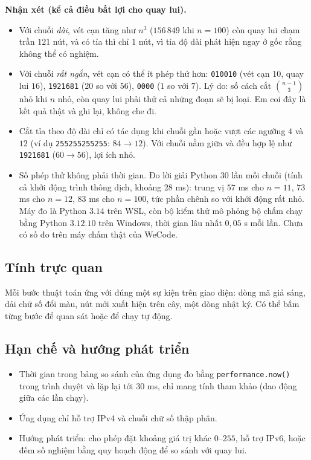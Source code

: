 \documentclass[12pt,a4paper]{article}
\begin{document}
\textbf{Nhận xét (kể cả điều bất lợi cho quay lui).}
\begin{itemize}
    \item Với chuỗi \emph{dài}, vét cạn tăng như $n^3$ ($156\,849$ khi $n=100$) còn quay lui chạm trần $121$ nút, và có tỉa thì chỉ $1$ nút, vì tỉa độ dài phát hiện ngay ở gốc rằng không thể có nghiệm.
    \item Với chuỗi \emph{rất ngắn}, vét cạn có thể ít phép thử hơn: \texttt{010010} (vét cạn $10$, quay lui $16$), \texttt{1921681} ($20$ so với $56$), \texttt{0000} ($1$ so với $7$). Lý do: số cách cắt $\binom{n-1}{3}$ nhỏ khi $n$ nhỏ, còn quay lui phải thử cả những đoạn sẽ bị loại. Em coi đây là kết quả thật và ghi lại, không che đi.
    \item Cắt tỉa theo độ dài chỉ có tác dụng khi chuỗi gần hoặc vượt các ngưỡng $4$ và $12$ (ví dụ \texttt{255255255255}: $84 \to 12$). Với chuỗi nằm giữa và đều hợp lệ như \texttt{1921681} ($60 \to 56$), lợi ích nhỏ.
    \item Số phép thử không phải thời gian. Đo lời giải Python $30$ lần mỗi chuỗi (tính cả khởi động trình thông dịch, khoảng $28$ ms): trung vị $57$ ms cho $n=11$, $73$ ms cho $n=12$, $83$ ms cho $n=100$, tức phần chênh so với khởi động rất nhỏ. Máy đo là Python $3.14$ trên WSL, còn bộ kiểm thử mô phỏng bộ chấm chạy bằng Python $3.12.10$ trên Windows, thời gian lâu nhất $0{,}05$ s mỗi lần. Chưa có số đo trên máy chấm thật của WeCode.
\end{itemize}

\subsection{Tính trực quan}
Mỗi bước thuật toán ứng với đúng một sự kiện trên giao diện: dòng mã giả sáng, dải chữ số đổi màu, nút mới xuất hiện trên cây, một dòng nhật ký. Có thể bấm từng bước để quan sát hoặc để chạy tự động.

\subsection{Hạn chế và hướng phát triển}
\begin{itemize}
    \item Thời gian trong bảng so sánh của ứng dụng đo bằng \texttt{performance.now()} trong trình duyệt và lặp lại tới $30$ ms, chỉ mang tính tham khảo (dao động giữa các lần chạy).
    \item Ứng dụng chỉ hỗ trợ IPv4 và chuỗi chữ số thập phân.
    \item Hướng phát triển: cho phép đặt khoảng giá trị khác $0$--$255$, hỗ trợ IPv6, hoặc đếm số nghiệm bằng quy hoạch động để so sánh với quay lui.
\end{itemize}
\end{document}
